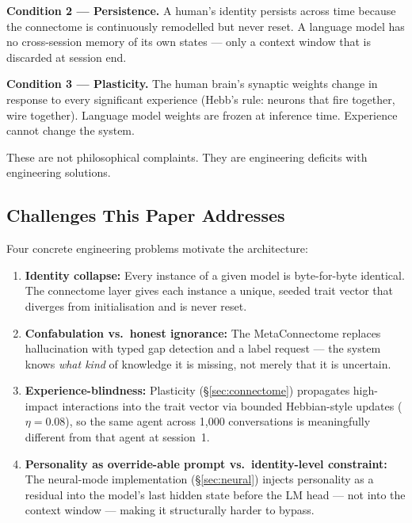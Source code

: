 \documentclass[11pt,a4paper]{article}
\begin{document}
\textbf{Condition 2 — Persistence.} A human's identity persists across time because the
connectome is continuously remodelled but never reset. A language model has no
cross-session memory of its own states — only a context window that is discarded at
session end.

\textbf{Condition 3 — Plasticity.} The human brain's synaptic weights change in response
to every significant experience (Hebb's rule: neurons that fire together, wire together).
Language model weights are frozen at inference time. Experience cannot change the system.

These are not philosophical complaints. They are engineering deficits with engineering
solutions.

\subsection{Challenges This Paper Addresses}

Four concrete engineering problems motivate the architecture:

\begin{enumerate}[leftmargin=*]
  \item \textbf{Identity collapse:} Every instance of a given model is byte-for-byte
  identical. The connectome layer gives each instance a unique, seeded trait vector that
  diverges from initialisation and is never reset.

  \item \textbf{Confabulation vs.\ honest ignorance:} The MetaConnectome replaces
  hallucination with typed gap detection and a label request — the system knows
  \textit{what kind} of knowledge it is missing, not merely that it is uncertain.

  \item \textbf{Experience-blindness:} Plasticity (\S\ref{sec:connectome}) propagates
  high-impact interactions into the trait vector via bounded Hebbian-style updates
  ($\eta = 0.08$), so the same agent across 1{,}000 conversations is meaningfully
  different from that agent at session~1.

  \item \textbf{Personality as override-able prompt vs.\ identity-level constraint:} The
  neural-mode implementation (\S\ref{sec:neural}) injects personality as a residual into
  the model's last hidden state before the LM head — not into the context window —
  making it structurally harder to bypass.
\end{enumerate}
\end{document}
